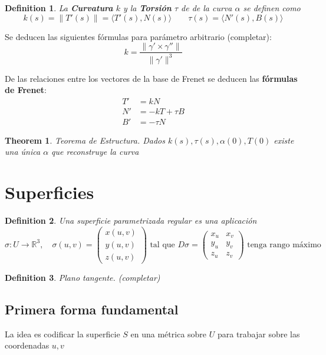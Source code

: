 \documentclass{myclass}
\newtheorem*{definition}{Definition}
\newtheorem*{theorem}{Theorem}
\begin{document}
\begin{definition}
La \textbf{Curvatura} $k$ y la \textbf{Torsión} $\tau $ de de la curva $\alpha$ se definen como
 \[
k(s) = \|T'(s)\|= \langle T'(s) , N(s) \rangle   \qquad  \tau(s) = \langle N'(s) , B(s) \rangle 
\] 
\end{definition}
Se deducen las siguientes fórmulas para parámetro arbitrario (completar):
 \[
k = \frac{\|\gamma' \times \gamma''\|}{\|\gamma'\|^3}
\] 

De las relaciones entre los vectores de la base de Frenet se deducen las \textbf{fórmulas de Frenet}:
\begin{align*}
  T' &= kN \\
  N' &= -kT + \tau B \\
  B' &= -\tau N 
\end{align*}

\begin{theorem}
Teorema de Estructura. Dados $k(s), \tau (s), \alpha(0), T(0)$ existe una única $\alpha$ que reconstruye la curva
\end{theorem}


\section{Superficies}
\begin{definition}
Una \textit{superficie parametrizada regular} es una aplicación
\[
  \sigma : U \to \mathbb{R}^3, \quad \sigma(u, v) = \begin{pmatrix} x(u, v) \\ y(u, v) \\ z(u, v) \end{pmatrix} \text{ tal que } D\sigma = \begin{pmatrix} x_u & x_v \\ y_u & y_v \\ z_u & z_v \end{pmatrix}  \text{ tenga rango máximo} 
\] 
\end{definition}

\begin{definition}
Plano tangente. (completar)
\end{definition}

\subsection{Primera forma fundamental}
La idea es codificar la superficie $S$ en una métrica sobre  $U$ para trabajar sobre las coordenadas  $u, v$
\end{document}
